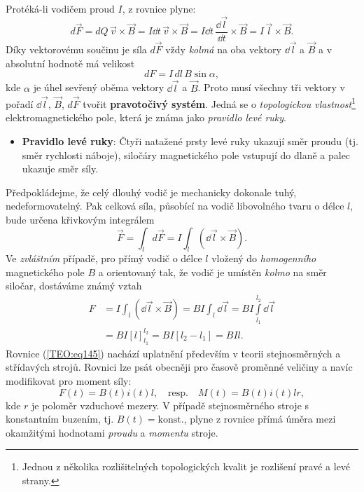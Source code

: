       Protéká-li vodičem proud \(I\), z rovnice plyne:
      \begin{equation*}
        d\vec{F} =  dQ\,\vec{v}\times\vec{B} 
                 = I\dd{t}\,\vec{v}\times\vec{B} 
                 = I\dd{t}\,\frac{\dd{\vec{l}}}{\dd{t}}\times\vec{B}
                 = I\,\vec{l}\times\vec{B}.
      \end{equation*}
      Díky vektorovému součinu je síla \(d\vec{F}\) vždy \emph{kolmá} na oba vektory \(\dd{\vec{l}}\) a 
      \(\vec{B}\) a v absolutní hodnotě má velikost
      \begin{equation*}
              dF=I\,dl\,B\sin\alpha,
      \end{equation*}
      kde \(\alpha\) je úhel sevřený oběma vektory \(\dd{\vec{l}}\) a \(\vec{B}\). Proto musí všechny 
      tři vektory v pořadí \(\dd{\vec{l}}\), \(\vec{B}\), \(d\vec{F}\) tvořit \textbf{pravotočivý 
      systém}. Jedná se o \emph{topologickou vlastnost}\footnote{Jednou z několika rozlišitelných 
      topologických kvalit je rozlišení pravé a levé strany.} elektromagnetického pole, která je 
      známa jako \emph{pravidlo levé ruky}.
      \begin{itemize}
        \item \textbf{Pravidlo levé ruky}: Čtyři natažené prsty levé ruky ukazují směr proudu (tj. 
              směr rychlosti náboje), siločáry magnetického pole vstupují do dlaně a palec ukazuje 
              směr síly.
      \end{itemize}

      Předpokládejme, že celý dlouhý vodič je mechanicky dokonale tuhý, nedeformovatelný. Pak 
      celková síla, působící na vodič libovolného tvaru o délce \(l\), bude určena křivkovým 
      integrálem
      \begin{equation*}
        \vec{F} = \int_ld\vec{F} 
                = I\int_l (\dd{\vec{l}}\times\vec{B}).
      \end{equation*}
      Ve \emph{zvláštním} případě, pro přímý vodič o délce \(l\) vložený do \emph{homogenního} 
      magnetického pole \(B\) a orientovaný tak, že vodič je umístěn \emph{kolmo} na směr siločar, 
      dostáváme známý vztah
      \begin{align}\label{TEO:eq145}
        F &=  I\int_l (\dd{\vec{l}}\times\vec{B})
           = BI\int_l \dd{\vec{l}} = BI\int\limits_{l_1}^{l_2}\dd{\vec{l}}  \nonumber \\
          &= BI[l]_{l_1}^{l_2}
           = BI[l_2 - l_1]
           = BIl.
      \end{align}
      Rovnice (\ref{TEO:eq145}) nachází uplatnění především v teorii stejnosměrných a 
      střídavých strojů. Rovnici lze psát obecněji pro časově proměnné veličiny a navíc modifikovat 
      pro moment síly:
      \begin{equation*}
        F(t)=B(t)i(t)l, \quad\text{resp.} \quad M(t)=B(t)i(t)lr,
      \end{equation*}
      kde \(r\) je poloměr vzduchové mezery. V případě stejnosměrného stroje s konstantním buzením, 
      tj. \(B(t) = \text{konst.}\), plyne z rovnice přímá úměra mezi okamžitými hodnotami 
      \emph{proudu} a \emph{momentu} stroje.


